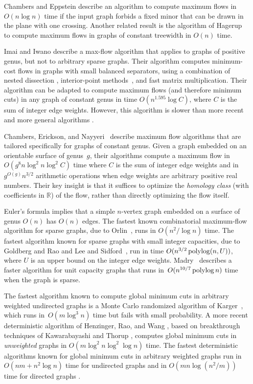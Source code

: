 \documentclass[letterpaper,review]{siamart190516}
\def\Real{\mathbb{R}}
\begin{document}
Chambers and Eppstein \cite{ce-focmf-13} describe an algorithm to compute maximum flows in $O(n\log n)$ time if the input graph forbids a fixed minor that can be drawn in the plane with one crossing.  Another related result is the algorithm of Hagerup \etal~\cite{hknr-cmfnc-98} to compute maximum flows in graphs of constant treewidth in $O(n)$ time.

Imai and Iwano \cite{ii-espap-90} describe a max-flow algorithm that applies to graphs of positive genus, but not to arbitrary sparse graphs.
Their algorithm computes minimum-cost flows in graphs with small balanced separators, using a combination of nested dissection \cite{lrt-gnd-79, pr-fepss-93}, interior-point methods~\cite{v-slpfm-89}, and fast matrix multiplication.
Their algorithm can be adapted to compute maximum flows (and therefore minimum cuts) in any graph of constant genus in time $O(n^{1.595}\log C)$, where $C$ is the sum of integer edge weights.
However, this algorithm is slower than more recent and more general algorithms \cite{ds-flgfi-08, gr-bfdb-98}.

Chambers, Erickson, and Nayyeri~\cite{cen-hfcc-12} describe maximum flow algorithms that are tailored specifically for graphs of constant genus.
Given a graph embedded on an orientable surface of genus~$g$, their algorithms compute a maximum flow in  $O(g^8 n \log^2 n \log^2 C)$ time where $C$ is the sum of integer edge weights and in $g^{O(g)}n^{3/2}$ arithmetic operations when edge weights are arbitrary positive real numbers.  Their key insight is that it suffices to optimize the \emph{homology class} (with coefficients in $\Real$) of the flow, rather than directly optimizing the flow itself.

Euler's formula implies that a simple $n$-vertex graph embedded on a surface of genus $O(n)$ has $O(n)$ edges.
The fastest known combinatorial maximum-flow algorithm for sparse graphs, due to Orlin~\cite{o-mfotl-13}, runs in $O(n^2 / \log n)$ time.
The fastest algorithm known for sparse graphs with small integer capacities, due to Goldberg and Rao
\cite{gr-bfdb-98} and Lee and Sidford~\cite{ls-pfmlp-14}, run in time $O(n^{3/2} \operatorname{polylog}(n, U))$, where $U$ is an upper bound on the integer edge weights.
Madry~\cite{m-ncpef-13} describes a faster algorithm for unit capacity graphs that runs
in~$O(n^{10/7} \operatorname{polylog} n)$ time when the graph is sparse.

The fastest algorithm known to compute global minimum cuts in arbitrary weighted undirected graphs is a Monte Carlo randomized algorithm of Karger~\cite{k-mcnlt-00}, which runs in~$O(m \log^3 n)$ time but fails with small probability. 
A more recent deterministic algorithm of Henzinger, Rao, and Wang \cite{hrw-lfpfe-17}, based on breakthrough techniques of Kawarabayashi and Thorup \cite{kt-dgmcs-15,kt-decnt-18}, computes global minimum cuts in \emph{unweighted} graphs in $O(m \log^2 n \log^2 \log n)$ time.
The fastest deterministic algorithms known for global minimum cuts in arbitrary weighted graphs run in $O(nm + n^2\log n)$ time for undirected graphs \cite{ni-cemcg-92,f-eani-94,sw-sma-97} and in $O(mn \log(n^2/m))$ time for directed graphs \cite{ho-fafmd-94}.
\end{document}
